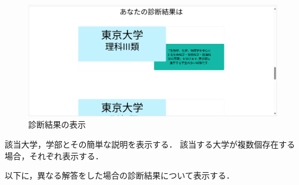 \documentclass[a4j, titlepage]{jarticle}
\begin{document}
\begin{itemize}
\begin{figure}[h]
\includegraphics{dousakekka-3.png}
\caption{診断結果の表示}
\end{figure}

該当大学，学部とその簡単な説明を表示する．
該当する大学が複数個存在する場合，それぞれ表示する．

以下に，異なる解答をした場合の診断結果について表示する．


\end{itemize}
\end{document}
